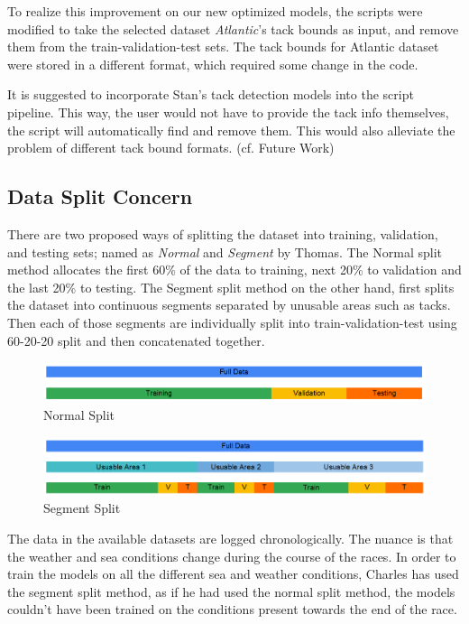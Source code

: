 \documentclass[12pt,twoside]{report}
\begin{document}
To realize this improvement on our new optimized models, the scripts were modified to take the selected dataset \textit{Atlantic}'s tack bounds as input, and remove them from the train-validation-test sets. The tack bounds for Atlantic dataset were stored in a different format, which required some change in the code.

It is suggested to incorporate Stan's tack detection models into the script pipeline. This way, the user would not have to provide the tack info themselves, the script will automatically find and remove them. This would also alleviate the problem of different tack bound formats. (cf. Future Work)

\subsection{Data Split Concern}

There are two proposed ways of splitting the dataset into training, validation, and testing sets; named as \emph{Normal} and \emph{Segment} by Thomas. The Normal split method allocates the first 60\% of the data to training, next 20\% to validation and the last 20\% to testing. The Segment split method on the other hand, first splits the dataset into continuous segments separated by unusable areas such as tacks. Then each of those segments are individually split into train-validation-test using 60-20-20 split and then concatenated together.

\begin{figure}[h]
\centering
\includegraphics[width = \hsize]{figures/Contribution/Normal Split.png}
\caption{Normal Split}
\end{figure}

\begin{figure}[h]
\centering
\includegraphics[width = \hsize]{figures/Contribution/Segment Split.png}
\caption{Segment Split}
\end{figure}

The data in the available datasets are logged chronologically. The nuance is that the weather and sea conditions change during the course of the races. In order to train the models on all the different sea and weather conditions, Charles has used the segment split method, as if he had used the normal split method, the models couldn't have been trained on the conditions present towards the end of the race.
\end{document}
